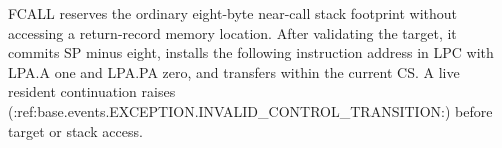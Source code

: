 FCALL reserves the ordinary eight-byte near-call stack footprint without accessing a return-record memory location. After validating the target, it commits SP minus eight, installs the following instruction address in LPC with LPA.A one and LPA.PA zero, and transfers within the current CS. A live resident continuation raises (:ref:base.events.EXCEPTION.INVALID_CONTROL_TRANSITION:) before target or stack access.
